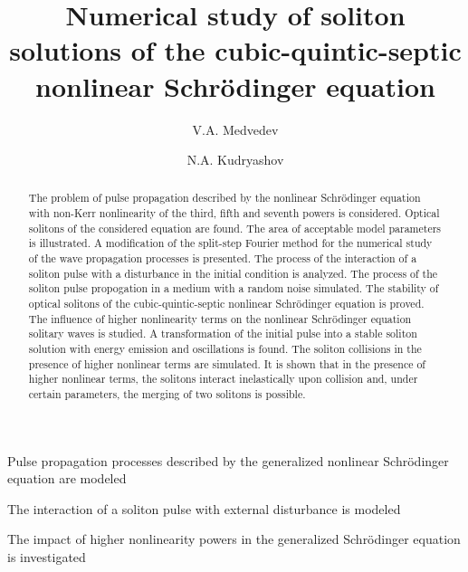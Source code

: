 \documentclass[preprint,12pt]{elsarticle}
\begin{document}
\begin{frontmatter}


\title{Numerical study of soliton solutions of the cubic-quintic-septic nonlinear Schr\"{o}dinger equation}



\author{V.A. Medvedev }
\author{N.A. Kudryashov}

\address{Department of Applied Mathematics, National Research Nuclear University MEPhI (Moscow Engineering Physics Institute), 31 Kashirskoe Shosse, 115409 Moscow, Russian Federation}


\begin{abstract}
The problem of pulse propagation described by the nonlinear Schr\"{o}dinger equation with non-Kerr nonlinearity of the third, fifth and seventh powers is considered. Optical solitons of the considered equation are found. The area of acceptable model parameters is illustrated. A modification of the split-step Fourier method for the numerical study of the wave propagation processes is presented. The process of the interaction of a soliton pulse with a disturbance in the initial condition is analyzed. The process of the soliton pulse propogation in a medium with a random noise simulated. The stability of optical solitons of the cubic-quintic-septic nonlinear Schr\"{o}dinger equation is proved. The influence of higher nonlinearity terms on the nonlinear Schr\"{o}dinger equation solitary waves is studied. A transformation of the initial pulse into a stable soliton solution with energy emission and oscillations is found. The soliton collisions in the presence of higher nonlinear terms are simulated. It is shown that in the presence of higher nonlinear terms, the solitons interact inelastically upon collision and, under certain parameters, the merging of two solitons is possible.
\end{abstract}

\begin{graphicalabstract}
\end{graphicalabstract}

\begin{highlights}
\item Pulse propagation processes described by the generalized nonlinear Schr\"{o}dinger equation are modeled
\item The interaction of a soliton pulse with external disturbance is modeled
\item The impact of higher nonlinearity powers in the generalized Schr\"{o}dinger equation is investigated 
\end{highlights}


\end{frontmatter}
\end{document}
